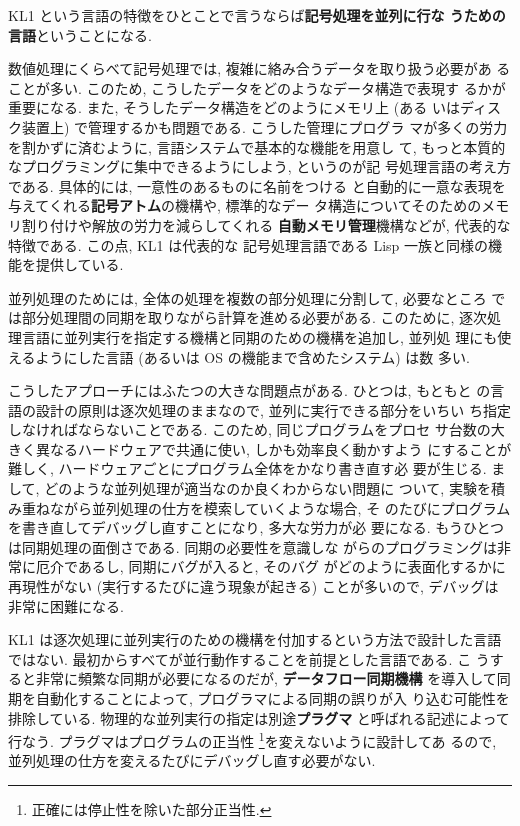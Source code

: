 \documentclass[a4,titlepage]{jsreport}
\def\em{\bf\dg}
\let\dg\bf
\begin{document}
KL1 という言語の特徴をひとことで言うならば{\bf\dg 記号処理を並列に行な
うための言語}ということになる.

数値処理にくらべて記号処理では, 複雑に絡み合うデータを取り扱う必要があ
ることが多い.  このため, こうしたデータをどのようなデータ構造で表現す
るかが重要になる.  また, そうしたデータ構造をどのようにメモリ上 (ある
いはディスク装置上) で管理するかも問題である.  こうした管理にプログラ
マが多くの労力を割かずに済むように, 言語システムで基本的な機能を用意し
て, もっと本質的なプログラミングに集中できるようにしよう, というのが記
号処理言語の考え方である.  具体的には, 一意性のあるものに名前をつける
と自動的に一意な表現を与えてくれる{\em 記号アトム}の機構や, 標準的なデー
タ構造についてそのためのメモリ割り付けや解放の労力を減らしてくれる{\em 
自動メモリ管理}機構などが, 代表的な特徴である.  この点, KL1 は代表的な
記号処理言語である Lisp 一族と同様の機能を提供している.

並列処理のためには, 全体の処理を複数の部分処理に分割して, 必要なところ
では部分処理間の同期を取りながら計算を進める必要がある.  このために, 
逐次処理言語に並列実行を指定する機構と同期のための機構を追加し, 並列処
理にも使えるようにした言語 (あるいは OS の機能まで含めたシステム) は数
多い.

こうしたアプローチにはふたつの大きな問題点がある.  ひとつは, もともと
の言語の設計の原則は逐次処理のままなので, 並列に実行できる部分をいちい
ち指定しなければならないことである.  このため, 同じプログラムをプロセ
サ台数の大きく異なるハードウェアで共通に使い, しかも効率良く動かすよう
にすることが難しく, ハードウェアごとにプログラム全体をかなり書き直す必
要が生じる. まして, どのような並列処理が適当なのか良くわからない問題に
ついて, 実験を積み重ねながら並列処理の仕方を模索していくような場合, そ
のたびにプログラムを書き直してデバッグし直すことになり, 多大な労力が必
要になる.  もうひとつは同期処理の面倒さである.  同期の必要性を意識しな
がらのプログラミングは非常に厄介であるし, 同期にバグが入ると, そのバグ
がどのように表面化するかに再現性がない (実行するたびに違う現象が起きる) 
ことが多いので, デバッグは非常に困難になる.

KL1 は逐次処理に並列実行のための機構を付加するという方法で設計した言語
ではない.  最初からすべてが並行動作することを前提とした言語である.  こ
うすると非常に頻繁な同期が必要になるのだが, {\em データフロー同期機構}
を導入して同期を自動化することによって, プログラマによる同期の誤りが入
り込む可能性を排除している.  物理的な並列実行の指定は別途{\em プラグマ}
と呼ばれる記述によって行なう.  プラグマはプログラムの正当性
\footnote{正確には停止性を除いた部分正当性.}を変えないように設計してあ
るので, 並列処理の仕方を変えるたびにデバッグし直す必要がない.
\end{document}
